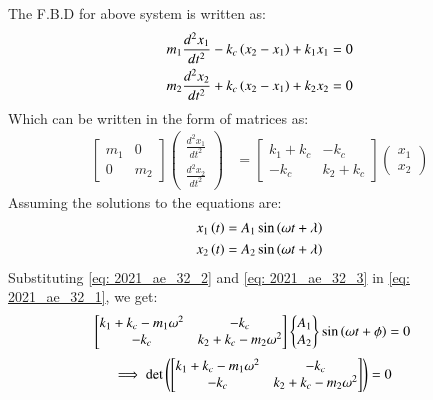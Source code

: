 \documentclass[journal,12pt,twocolumn]{IEEEtran}
\theoremstyle{remark}
\begin{document}
The F.B.D for above system is written as:
\begin{align}
m_1 \frac{d^2 x_1}{dt^2} - k_c\left(x_2-x_1\right) + k_1 x_1 &=0\\
m_2 \frac{d^2 x_2}{dt^2} + k_c\left(x_2-x_1\right) + k_2 x_2 &=0
\end{align}
Which can be written in the form of matrices as:
\begin{align}
\begin{bmatrix}
m_1&0\\
0&m_2\end{bmatrix}
\begin{pmatrix}
\frac{d^2x_1}{dt^2}\\
\frac{d^2x_2}{dt^2}
\end{pmatrix}
&= \begin{bmatrix}
k_1+k_c&-k_c\\
-k_c&k_2+k_c\end{bmatrix}
\begin{pmatrix}
x_1\\
x_2
\end{pmatrix} \label{eq: 2021_ae_32_1}
\end{align}
Assuming the solutions to the equations are:
\begin{align}
x_1\left(t\right) &= A_1\sin{\ensuremath{\left(\omega t + \lambda\right)}} \label{eq: 2021_ae_32_2}\\
x_2\left(t\right) &= A_2\sin{\ensuremath{\left(\omega t + \lambda\right)}} \label{eq: 2021_ae_32_3}
\end{align}
Substituting \eqref{eq: 2021_ae_32_2} and \eqref{eq: 2021_ae_32_3} in \eqref{eq: 2021_ae_32_1}, we get:
\begin{align}
\begin{bmatrix}
k_1+k_c- m_1\omega^2&-k_c\\
-k_c&k_2+k_c-m_2\omega^2\end{bmatrix}
\begin{Bmatrix}
A_1\\
A_2
\end{Bmatrix}
\sin{\ensuremath{\left(\omega t+ \phi\right)}} &=0\label{eq: 2021_ae_32_4}
\end{align}
\begin{align}
\implies \det\left(\begin{bmatrix}
k_1+k_c- m_1\omega ^2&-k_c\\
-k_c&k_2+k_c-m_2\omega ^2\end{bmatrix}\right) &=0 \label{eq: 2021_ae_32_5}
\end{align}
\newpage
\end{document}
